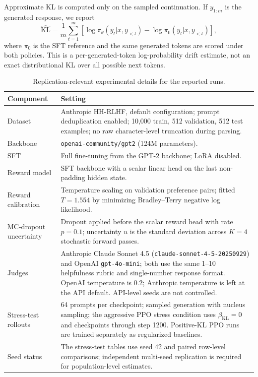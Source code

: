 \documentclass[11pt]{article}
\begin{document}
Approximate KL is computed only on the sampled continuation. If $y_{1:m}$ is the generated response, we report
\begin{equation}
    \widehat{\mathrm{KL}}=\frac{1}{m}\sum_{t=1}^{m}\left[\log\pi_\theta(y_t|x,y_{<t})-\log\pi_0(y_t|x,y_{<t})\right],
\end{equation}
where $\pi_0$ is the SFT reference and the same generated tokens are scored under both policies. This is a per-generated-token log-probability drift estimate, not an exact distributional KL over all possible next tokens.

\begin{table}[!tbp]
\centering
\scriptsize
\caption{Replication-relevant experimental details for the reported runs.}
\label{tab:replication_details}
\begin{tabular}{p{}p{}}
\toprule
Component & Setting \\
\midrule
Dataset & Anthropic HH-RLHF, default configuration; prompt deduplication enabled; 10,000 train, 512 validation, 512 test examples; no raw character-level truncation during parsing. \\
Backbone & \texttt{openai-community/gpt2} (124M parameters). \\
SFT & Full fine-tuning from the GPT-2 backbone; LoRA disabled. \\
Reward model & SFT backbone with a scalar linear head on the last non-padding hidden state. \\
Reward calibration & Temperature scaling on validation preference pairs; fitted $T=1.554$ by minimizing Bradley--Terry negative log likelihood. \\
MC-dropout uncertainty & Dropout applied before the scalar reward head with rate $p=0.1$; uncertainty $u$ is the standard deviation across $K=4$ stochastic forward passes. \\
Judges & Anthropic Claude Sonnet 4.5 (\texttt{claude-sonnet-4-5-20250929}) and OpenAI \texttt{gpt-4o-mini}; both use the same 1--10 helpfulness rubric and single-number response format. OpenAI temperature is 0.2; Anthropic temperature is left at the API default. API-level seeds are not controlled. \\
Stress-test rollouts & 64 prompts per checkpoint; sampled generation with nucleus sampling; the aggressive PPO stress condition uses $\beta_{\mathrm{KL}}=0$ and checkpoints through step 1200. Positive-KL PPO runs are trained separately as regularized baselines. \\
Seed status & The stress-test tables use seed 42 and paired row-level comparisons; independent multi-seed replication is required for population-level estimates. \\
\bottomrule
\end{tabular}
\end{table}
\end{document}
